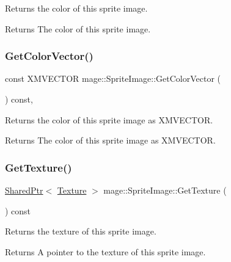Returns the color of this sprite image.

\begin{DoxyReturn}{Returns}
The color of this sprite image. 
\end{DoxyReturn}
\hypertarget{classmage_1_1_sprite_image_a65e6a26e2589afa2c6ccc463e7dd4264}{}\label{classmage_1_1_sprite_image_a65e6a26e2589afa2c6ccc463e7dd4264} 
\subsubsection{\texorpdfstring{Get\+Color\+Vector()}{GetColorVector()}}
{\footnotesize\ttfamily const X\+M\+V\+E\+C\+T\+OR mage\+::\+Sprite\+Image\+::\+Get\+Color\+Vector (\begin{DoxyParamCaption}{ }\end{DoxyParamCaption}) const\hspace{0.3cm}{\ttfamily [private]}, {\ttfamily [noexcept]}}

Returns the color of this sprite image as {\ttfamily X\+M\+V\+E\+C\+T\+OR}.

\begin{DoxyReturn}{Returns}
The color of this sprite image as {\ttfamily X\+M\+V\+E\+C\+T\+OR}. 
\end{DoxyReturn}
\hypertarget{classmage_1_1_sprite_image_af0702a186685d80bab77c23643be1674}{}\label{classmage_1_1_sprite_image_af0702a186685d80bab77c23643be1674} 
\subsubsection{\texorpdfstring{Get\+Texture()}{GetTexture()}}
{\footnotesize\ttfamily \hyperlink{namespacemage_a1e01ae66713838a7a67d30e44c67703e}{Shared\+Ptr}$<$ \hyperlink{classmage_1_1_texture}{Texture} $>$ mage\+::\+Sprite\+Image\+::\+Get\+Texture (\begin{DoxyParamCaption}{ }\end{DoxyParamCaption}) const\hspace{0.3cm}{\ttfamily [noexcept]}}

Returns the texture of this sprite image.

\begin{DoxyReturn}{Returns}
A pointer to the texture of this sprite image. 
\end{DoxyReturn}
\hypertarget{classmage_1_1_sprite_image_a20d8e8272cf62599f6c0e4b1ff4f3586}{}\label{classmage_1_1_sprite_image_a20d8e8272cf62599f6c0e4b1ff4f3586} 
